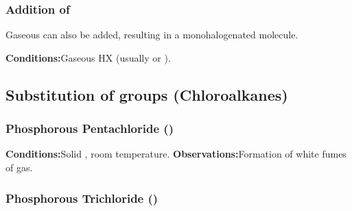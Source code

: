 			\subsubsection{Addition of }

				Gaseous  can also be added, resulting in a monohalogenated molecule.

				\vspace{1.5em}
				\vbox{\textbf{Conditions:}\tabto{35mm}Gaseous HX (usually  or ).}


		\pagebreak
		\subsection{Substitution of  groups (Chloroalkanes)}

			\subsubsection{Phosphorous Pentachloride ()}

				\vspace{1.5em}
				\vbox{\textbf{Conditions:}\tabto{35mm}Solid , room temperature.}
				\vbox{\textbf{Observations:}\tabto{35mm}Formation of white fumes of  gas.}



			\subsubsection{Phosphorous Trichloride ()}

